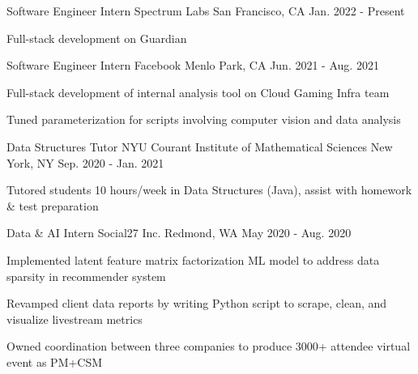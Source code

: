 

\begin{cventries}
  \cventry
    {Software Engineer Intern} %
    {Spectrum Labs} %
    {San Francisco, CA} %
    {Jan. 2022 - Present} %
    {
      \begin{cvitems} %
        \item {Full-stack development on Guardian}
      \end{cvitems}
    }

  \cventry
    {Software Engineer Intern} %
    {Facebook} %
    {Menlo Park, CA} %
    {Jun. 2021 - Aug. 2021} %
    {
      \begin{cvitems} %
        \item {Full-stack development of internal analysis tool on Cloud Gaming Infra team}
        \item {Tuned parameterization for scripts involving computer vision and data analysis}
      \end{cvitems}
    }

    \cventry
    {Data Structures Tutor} %
    {NYU Courant Institute of Mathematical Sciences} %
    {New York, NY} %
    {Sep. 2020 - Jan. 2021} %
    {
      \begin{cvitems} %
        \item {Tutored students 10 hours/week in Data Structures (Java), assist with homework \& test preparation}
      \end{cvitems}
    }

  \cventry
    {Data \& AI Intern} %
    {Social27 Inc.} %
    {Redmond, WA} %
    {May 2020 - Aug. 2020} %
    {
      \begin{cvitems} %
        \item {Implemented latent feature matrix factorization ML model to address data sparsity in recommender system}
        \item {Revamped client data reports by writing Python script to scrape, clean, and visualize livestream metrics}
        \item {Owned coordination between three companies to produce 3000+ attendee virtual event as PM+CSM}
      \end{cvitems}
    }


\end{cventries}

